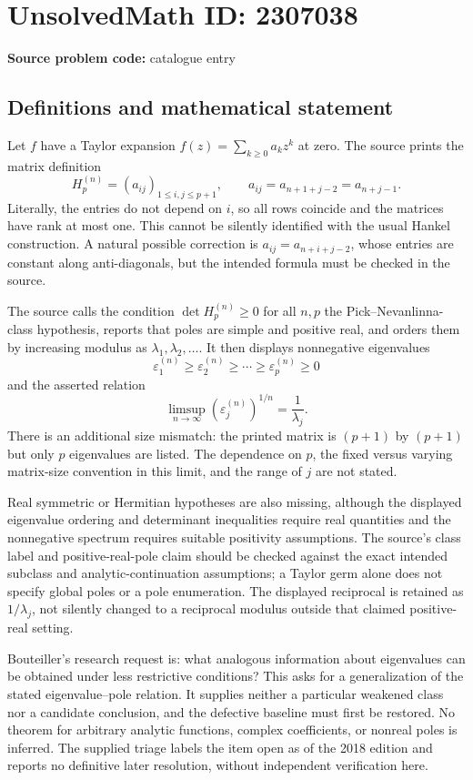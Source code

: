 \documentclass[11pt]{article}
\begin{document}
\section*{UnsolvedMath ID: 2307038}
\textbf{Source problem code:} catalogue entry
\subsection{Definitions and mathematical statement}
Let $f$ have a Taylor expansion $f(z)=\sum_{k\ge0}a_kz^k$ at zero. The source prints the matrix definition
\[
H_p^{(n)}=(a_{ij})_{1\le i,j\le p+1},\qquad
a_{ij}=a_{n+1+j-2}=a_{n+j-1}.
\]
Literally, the entries do not depend on $i$, so all rows coincide and the matrices have rank at most one. This cannot be silently identified with the usual Hankel construction. A natural possible correction is $a_{ij}=a_{n+i+j-2}$, whose entries are constant along anti-diagonals, but the intended formula must be checked in the source.

The source calls the condition $\det H_p^{(n)}\ge0$ for all $n,p$ the Pick--Nevanlinna-class hypothesis, reports that poles are simple and positive real, and orders them by increasing modulus as $\lambda_1,\lambda_2,\ldots$. It then displays nonnegative eigenvalues
\[
\varepsilon_1^{(n)}\ge\varepsilon_2^{(n)}\ge\cdots\ge\varepsilon_p^{(n)}\ge0
\]
and the asserted relation
\[
\limsup_{n\to\infty}(\varepsilon_j^{(n)})^{1/n}=\frac1{\lambda_j}.
\]
There is an additional size mismatch: the printed matrix is $(p+1)$ by $(p+1)$ but only $p$ eigenvalues are listed. The dependence on $p$, the fixed versus varying matrix-size convention in this limit, and the range of $j$ are not stated.

Real symmetric or Hermitian hypotheses are also missing, although the displayed eigenvalue ordering and determinant inequalities require real quantities and the nonnegative spectrum requires suitable positivity assumptions. The source's class label and positive-real-pole claim should be checked against the exact intended subclass and analytic-continuation assumptions; a Taylor germ alone does not specify global poles or a pole enumeration. The displayed reciprocal is retained as $1/\lambda_j$, not silently changed to a reciprocal modulus outside that claimed positive-real setting.

Bouteiller's research request is: what analogous information about eigenvalues can be obtained under less restrictive conditions? This asks for a generalization of the stated eigenvalue--pole relation. It supplies neither a particular weakened class nor a candidate conclusion, and the defective baseline must first be restored. No theorem for arbitrary analytic functions, complex coefficients, or nonreal poles is inferred. The supplied triage labels the item open as of the 2018 edition and reports no definitive later resolution, without independent verification here.
\end{document}
